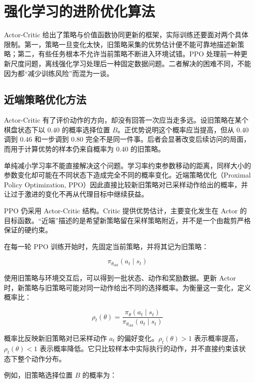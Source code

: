 \section{强化学习的进阶优化算法}
Actor-Critic 给出了策略与价值函数协同更新的框架，实际训练还要面对两个具体限制。第一，策略一旦变化太快，旧策略采集的优势估计便不能可靠地描述新策略；第二，有些任务根本不允许当前策略不断进入环境试错。PPO 处理前一种更新尺度问题，离线强化学习处理后一种固定数据问题。二者解决的困难不同，不能因为都“减少训练风险”而混为一谈。

\subsection{近端策略优化方法}

Actor-Critic 有了评价动作的方向，却没有回答一次应当走多远。设旧策略在某个棋盘状态下以 $0.40$ 的概率选择位置 $B$。正优势说明这个概率应当提高，但从 $0.40$ 调到 $0.46$ 和一步调到 $0.80$ 完全不是同一件事。后者会显著改变后续访问的局面，而用于计算优势的样本仍来自概率为 $0.40$ 的旧策略。

单纯减小学习率不能直接解决这个问题。学习率约束参数移动的距离，同样大小的参数变化却可能在不同状态下造成完全不同的概率变化。近端策略优化（Proximal Policy Optimization, PPO）因此直接比较新旧策略对已采样动作给出的概率，并让过于激进的变化不再从代理目标中继续获益。

PPO 仍采用 Actor-Critic 结构。Critic 提供优势估计，主要变化发生在 Actor 的目标函数。“近端”描述的是希望新策略留在采样策略附近，并不是一个由裁剪严格保证的硬约束。

在每一轮 PPO 训练开始时，先固定当前策略，并将其记为旧策略：

\begin{equation}
\pi_{\theta_{\mathrm{old}}}(a_t\mid s_t)
\end{equation}

使用旧策略与环境交互后，可以得到一批状态、动作和奖励数据。更新 Actor 时，新策略与旧策略可能对同一动作给出不同的选择概率。为衡量这一变化，定义概率比：

\begin{equation}
\rho_t(\theta)
=
\frac{
\pi_{\theta}(a_t\mid s_t)
}{
\pi_{\theta_{\mathrm{old}}}(a_t\mid s_t)
}
\end{equation}

概率比反映新旧策略对已采样动作 $a_t$ 的偏好变化。$\rho_t(\theta)>1$ 表示概率提高，$\rho_t(\theta)<1$ 表示概率降低。它只比较样本中实际执行的动作，并不直接约束该状态下整个动作分布。

例如，旧策略选择位置 $B$ 的概率为：

